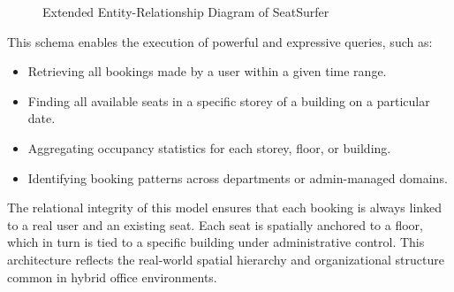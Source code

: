 \documentclass[12pt,a4paper]{report} %
\begin{document}
\begin{figure}[H]
    \centering
    \caption{Extended Entity-Relationship Diagram of SeatSurfer}
    \label{fig:erd}
\end{figure}

This schema enables the execution of powerful and expressive queries, such as:
\begin{itemize}
    \item Retrieving all bookings made by a user within a given time range.
    \item Finding all available seats in a specific storey of a building on a particular date.
    \item Aggregating occupancy statistics for each storey, floor, or building.
    \item Identifying booking patterns across departments or admin-managed domains.
\end{itemize}

The relational integrity of this model ensures that each booking is always linked to a real user and an existing seat. Each seat is spatially anchored to a floor, which in turn is tied to a specific building under administrative control. This architecture reflects the real-world spatial hierarchy and organizational structure common in hybrid office environments.
\end{document}
